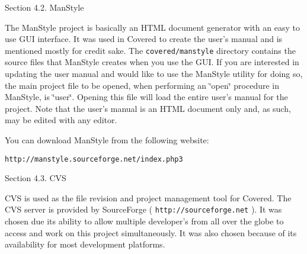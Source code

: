 \begin{Desc}
\item[Section 4.2. Man\-Style]\end{Desc}
\begin{Desc}
\item[]The Man\-Style project is basically an HTML document generator with an easy to use GUI interface. It was used in Covered to create the user's manual and is mentioned mostly for credit sake. The {\tt covered/manstyle} directory contains the source files that Man\-Style creates when you use the GUI. If you are interested in updating the user manual and would like to use the Man\-Style utility for doing so, the main project file to be opened, when performing an \char`\"{}open\char`\"{} procedure in Man\-Style, is \char`\"{}user\char`\"{}. Opening this file will load the entire user's manual for the project. Note that the user's manual is an HTML document only and, as such, may be edited with any editor.\end{Desc}
\begin{Desc}
\item[]You can download Man\-Style from the following website:\end{Desc}
\begin{Desc}
\item[]{\tt http://manstyle.sourceforge.net/index.php3}\end{Desc}




\begin{Desc}
\item[Section 4.3. CVS]\end{Desc}
\begin{Desc}
\item[]CVS is used as the file revision and project management tool for Covered. The CVS server is provided by Source\-Forge ( {\tt http://sourceforge.net} ). It was chosen due its ability to allow multiple developer's from all over the globe to access and work on this project simultaneously. It was also chosen because of its availability for most development platforms.\end{Desc}




